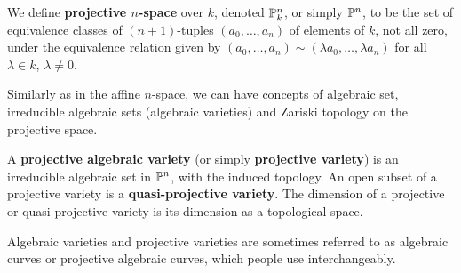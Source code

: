    \begin{definition}
   	We define \textbf{projective $n$-space} over $k$,
	denoted $\P_k^n$, or simply $\P^n$,
	to be the set of equivalence classes of $(n + 1)$-tuples
	$(a_0, \ldots, a_n)$ of elements of $k$, 
	not all zero,
	under the equivalence relation given by 
	$(a_0, \ldots, a_n) \sim (\lambda a_0, \ldots, \lambda a_n)$ 
	for all $\lambda \in k$, $\lambda \ne 0$. 
   \end{definition} 
   
   Similarly as in the affine $n$-space,
   we can have concepts of algebraic set, irreducible algebraic sets
   (algebraic varieties) and Zariski topology on the projective space.
   
   \begin{definition}
   	A \textbf{projective algebraic variety} (or simply \textbf{projective variety}) is an irreducible algebraic set in $\P^n$, 
	with the induced topology.
	An open subset of a projective variety is a 
	\textbf{quasi-projective variety}.
	The dimension of a projective or quasi-projective variety 
	is its dimension as a topological space.
   \end{definition}
   
   Algebraic varieties and projective varieties are sometimes referred to as 
   algebraic curves or projective algebraic curves,
   which people use interchangeably. 